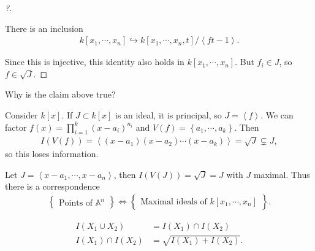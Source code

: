 \begin{proof}[?]
\begin{claim}

There is an inclusion
\begin{align*}  
k[x_1, \cdots, x_n] \hookrightarrow
k[x_1, \cdots, x_n, t]/\left\langle{ft-1}\right\rangle
.\end{align*}

\end{claim}

Since this is injective, this identity also holds in
\(k[x_1, \cdots, x_n]\). But \(f_i\in J\), so \(f\in \sqrt{J}\).

\end{proof}

\begin{exercise}[?]

Why is the claim above true?

\end{exercise}

\begin{example}

Consider \(k[x]\). If \(J\subset k[x]\) is an ideal, it is principal, so
\(J = \left\langle{f}\right\rangle\). We can factor
\(f(x) = \prod_{i=1}^k (x-a_i)^{n_i}\) and
\(V(f) = \left\{{a_1, \cdots, a_k}\right\}\). Then
\begin{align*}
I(V(f)) = \left\langle{(x-a_1)(x-a_2)\cdots(x-a_k)}\right\rangle = \sqrt{J} \subsetneq J
,\end{align*}
so this loses information.

\end{example}

\begin{example}

Let \(J = \left\langle{x-a_1, \cdots, x-a_n}\right\rangle\), then
\(I(V(J)) = \sqrt{J} = J\) with \(J\) maximal. Thus there is a
correspondence
\begin{align*}  
\left\{{\substack{\text{Points of } {\mathbb{A}}^n}}\right\} \iff 
\left\{{\substack{\text{Maximal ideals of }k[x_1, \cdots, x_n]}}\right\}
.\end{align*}

\end{example}

\begin{theorem}[Properties of $I$]

\envlist

\begin{align*}  
I(X_1 \cup X_2)       &= I(X_1) \cap I(X_2) \tag{a} \\
I(X_1) \cap I(X_2) &= \sqrt{I(X_1) + I(X_2)} \tag{b}
.\end{align*}

\end{theorem}

